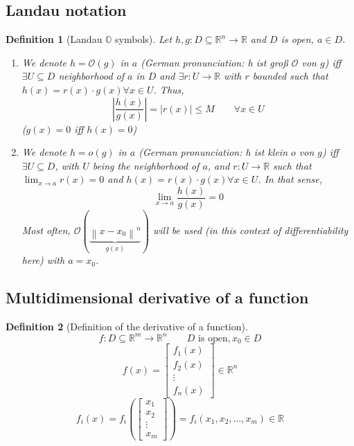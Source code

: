 \documentclass{article}
\newtheorem{definition}{Definition}  \numberwithin{definition}{section}
\newcommand{\norm}[1]{\left\|#1\right\|}
\newcommand{\card}[1]{\left|#1\right|}
\begin{document}
\subsection{Landau notation}
\begin{definition}[Landau $\mathbb O$ symbols] %
  Let $h, g: D \subseteq \mathbb R^n \to \mathbb R$ and $D$ is open, $a \in D$.
  \begin{enumerate}
    \item We denote $h = \mathcal O(g)$ in $a$ (German pronunciation: \foreignlanguage{german}{h ist groß $\mathcal O$ von $g$}) iff
      $\exists U \subseteq D$ neighborhood of $a$ in $D$ and $\exists r: U \to \mathbb R$ with $r$ bounded such that $h(x) = r(x) \cdot g(x) \forall x \in U$.
      Thus,
      \[ \card{\frac{h(x)}{g(x)}} = \card{r(x)} \leq M \qquad \forall x \in U \]
      ($g(x) = 0$ iff $h(x) = 0$)
    \item We denote $h = o(g)$ in $a$ (German pronunciation: \foreignlanguage{german}{h ist klein $o$ von $g$}) iff $\exists U \subseteq D$, with $U$ being the neighborhood of $a$, and $r: U \to \mathbb R$ such that $\lim_{x\to a} r(x) = 0$
    and $h(x) = r(x) \cdot g(x) \forall x \in U$. In that sense,
      \[ \lim_{x \to a} \frac{h(x)}{g(x)} = 0 \]
      Most often, $\mathcal O(\underbrace{\norm{x - x_0}^n}_{g(x)})$ will be used (in this context of differentiability here) with $a = x_0$.
  \end{enumerate}
\end{definition}

\subsection{Multidimensional derivative of a function}
\begin{definition}[Definition of the derivative of a function]
  \[ f: D \subseteq \mathbb R^m \to \mathbb R^n \qquad D \text{ is open}, x_0 \in D \]
  \[ f(x) = \begin{bmatrix} f_1(x) \\ f_2(x) \\ \vdots \\ f_n(x) \end{bmatrix} \in \mathbb R^n \]
  \[ f_i(x) = f_i\left(\begin{bmatrix} x_1 \\ x_2 \\ \vdots \\ x_m \end{bmatrix}\right) = f_i(x_1, x_2, \dots, x_m) \in \mathbb R \]
\end{definition}
\end{document}

